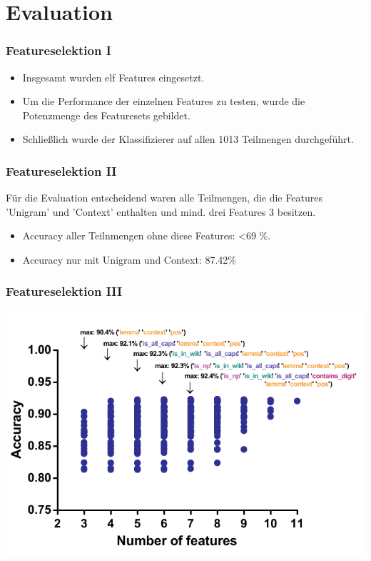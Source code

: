 \documentclass{beamer}
\begin{document}
\section{Evaluation}
	\begin{frame}
		\frametitle{Featureselektion I}
		\begin{itemize}
			\item <+->Insgesamt wurden elf Features eingesetzt.\\
			
			\item <+->Um die Performance der einzelnen Features zu testen, wurde die Potenzmenge des Featuresets gebildet.\\
			
			\item <+->Schließlich wurde der Klassifizierer auf allen 1013 Teilmengen durchgeführt.\\
		\end{itemize}
		
	\end{frame}
	\begin{frame}
		\frametitle{Featureselektion II}
			Für die Evaluation entscheidend waren alle Teilmengen, die die Features 'Unigram' und 'Context' enthalten und mind. drei Features 3 besitzen.\\
					
			\begin{itemize}
				\item Accuracy aller Teilnmengen ohne diese Features: \textless 69 \%.
				\item Accuracy nur mit Unigram und Context: 87.42\%
			\end{itemize}

					
	\end{frame}
		\begin{frame}
			\frametitle{Featureselektion III}
			\includegraphics[scale=0.9]{accuracy.pdf}\\

		\end{frame}
\end{document}
